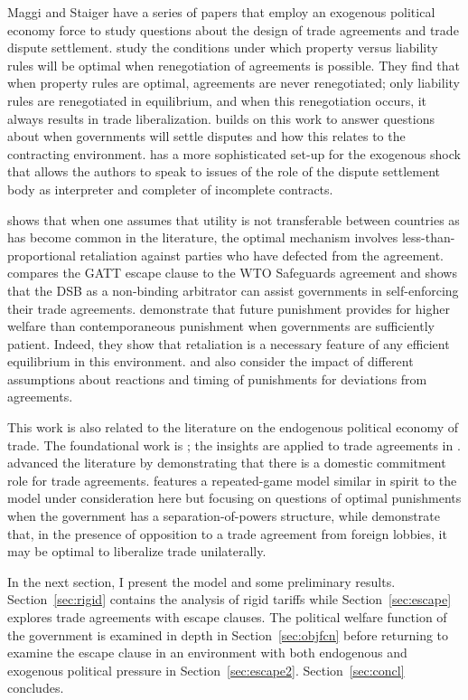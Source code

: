 Maggi and Staiger have a series of papers that employ an exogenous political economy force to study questions about the design of trade agreements and trade dispute settlement. \Textcite{ms2012a} study the conditions under which property versus liability rules will be optimal when renegotiation of agreements is possible. They find that when property rules are optimal, agreements are never renegotiated; only liability rules are renegotiated in equilibrium, and when this renegotiation occurs, it always results in trade liberalization. \Textcite{ms2013} builds on this work to answer questions about when governments will settle disputes and how this relates to the contracting environment. \Textcite{ms2011} has a more sophisticated set-up for the exogenous shock that allows the authors to speak to issues of the role of the dispute settlement body as interpreter and completer of incomplete contracts.
		
\Textcite{beshkar2010a} shows that when one assumes that utility is not transferable between countries as has become common in the literature, the optimal mechanism involves less-than-proportional retaliation against parties who have defected from the agreement. \Textcite{beshkar2010b} compares the GATT escape clause to the WTO Safeguards agreement and shows that the DSB as a non-binding arbitrator can assist governments in self-enforcing their trade agreements. \Textcite{martinvergote} demonstrate that future punishment provides for higher welfare than contemporaneous punishment when governments are sufficiently patient. Indeed, they show that retaliation is a necessary feature of any efficient equilibrium in this environment. \Textcite{hungerford} and \Textcite{riezman1991} also consider the impact of different assumptions about reactions and timing of punishments for deviations from agreements.

This work is also related to the literature on the endogenous political economy of trade. The foundational work is \Textcite{gh94}; the insights are applied to trade agreements in \Textcite{gh95}. \Textcite{mrc2007} advanced the literature by demonstrating that there is a domestic commitment role for trade agreements. \Textcite{buzard2013a} features a repeated-game model similar in spirit to the model under consideration here but focusing on questions of optimal punishments when the government has a separation-of-powers structure, while \Textcite{coatesludema} demonstrate that, in the presence of opposition to a trade agreement from foreign lobbies, it may be optimal to liberalize trade unilaterally.

In the next section, I present the model and some preliminary results. Section~\ref{sec:rigid} contains the analysis of rigid tariffs while Section~\ref{sec:escape} explores trade agreements with escape clauses. The political welfare function of the government is examined in depth in Section~\ref{sec:objfcn} before returning to examine the escape clause in an environment with both endogenous and exogenous political pressure in Section~\ref{sec:escape2}. Section~\ref{sec:concl} concludes.